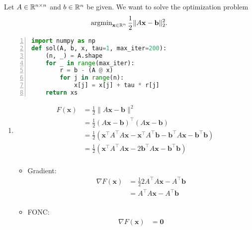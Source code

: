 Let \(A \in \mathbb{R}^{n \times n}\) and \(b \in \mathbb{R}^n\) be given. We want to solve the optimization problem
\begin{equation*}
    \operatorname{argmin}_{\mathbf{x} \in \mathbb{R}^n} \frac{1}{2} \|A\mathbf{x} - \mathbf{b}\|_2^2.
\end{equation*}
\begin{lstlisting}[language=Python, numbers=left, numberstyle=\tiny, stepnumber=1, numbersep=5pt]
import numpy as np
def sol(A, b, x, tau=1, max_iter=200):
    (n, _) = A.shape
    for _ in range(max_iter):
        r = b - (A @ x)
        for j in range(n):
            x[j] = x[j] + tau * r[j]
    return xs
\end{lstlisting}
\begin{enumerate}[label=(\alph*)]
    \item
          \begin{align*}
              F(\mathbf{x}) & = \frac12 \|A \mathbf{x} - \mathbf{b}\|^2                                                                                                                 \\
                            & = \frac12\left(A\mathbf{x} - \mathbf{b}\right)^\top \left(A\mathbf{x} - \mathbf{b}\right)                                                                 \\
                            & = \frac12\left(\mathbf{x}^\top A^\top A \mathbf{x} - \mathbf{x}^\top A^\top \mathbf{b} - \mathbf{b}^\top A \mathbf{x} - \mathbf{b}^\top \mathbf{b}\right) \\
                            & = \frac12\left(\mathbf{x}^\top A^\top A \mathbf{x} - 2\mathbf{b}^\top A \mathbf{x} - \mathbf{b}^\top \mathbf{b}\right)                                    \\
          \end{align*}
          \begin{itemize}
              \item Gradient:
                    \begin{align*}
                        \nabla F (\mathbf{x}) & = \frac12 2  A^\top A \mathbf{x} - A^\top \mathbf{b} \\
                                              & =  A^\top A \mathbf{x} - A^\top \mathbf{b}           \\
                    \end{align*}
              \item FONC:
                    \begin{align*}
                        \nabla F(\mathbf{x})                    & = \mathbf{0}                                   \\

\end{align*}
\end{itemize}
\end{enumerate}
